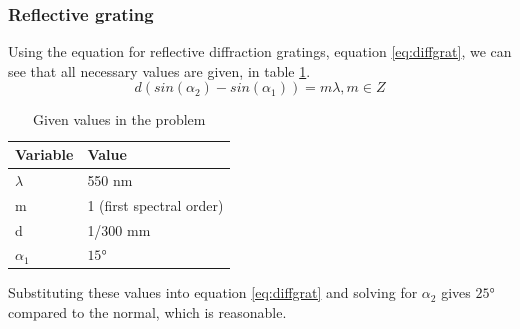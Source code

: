 \documentclass[a4paper]{article}
\begin{document}
\subsubsection{Reflective grating}
Using the equation for reflective diffraction gratings, equation \ref{eq:diffgrat}, we can see that all necessary values are given, in table \ref{tab:values}.
\begin{equation}
    d(sin(\alpha_2) - sin(\alpha_1)) = m\lambda, m \in Z
    \label{eq:diffgrat}
\end{equation}

\begin{table}[h!]
    \centering
    \begin{tabular}{|l|l|}
    \hline
    Variable & Value                    \\ \hline
    $\lambda$       & 550 nm                   \\ \hline
    m        & 1 (first spectral order) \\ \hline
    d        & 1/300 mm                 \\ \hline
    $\alpha_1$ & $\ang{15}$             \\ \hline
    \end{tabular}
    \caption{Given values in the problem}
    \label{tab:values}
\end{table}
Substituting these values into equation \ref{eq:diffgrat} and solving for $\alpha_2$ gives $\ang{25}$ compared to the normal, which is reasonable.
\pagebreak
\end{document}
